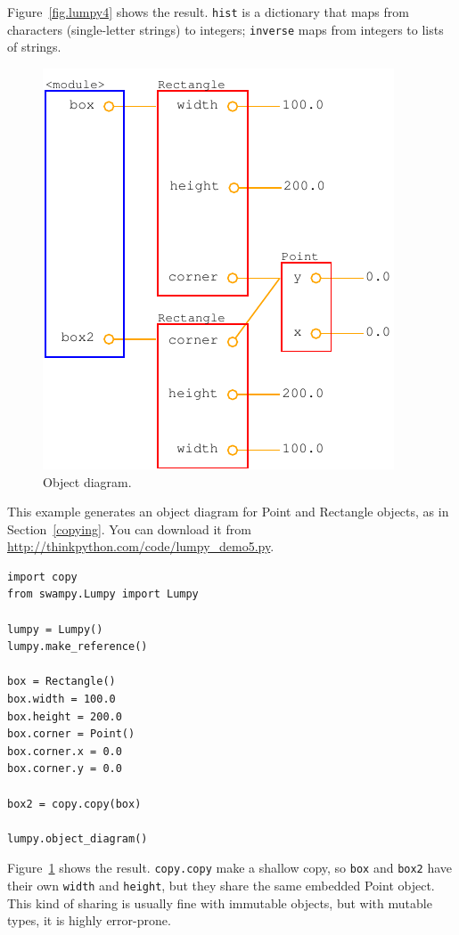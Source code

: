 \documentclass[10pt]{book}
\begin{document}
Figure~\ref{fig.lumpy4} shows the result.  {\tt hist} is a dictionary
that maps from characters (single-letter strings) to integers;
{\tt inverse} maps from integers to lists of strings.

\begin{figure}
\centerline
{\includegraphics[scale=0.7]{figs/lumpydemo5.pdf}}
\caption{Object diagram.}
\label{fig.lumpy5}
\end{figure}

This example generates an object diagram for Point and Rectangle
objects, as in Section~\ref{copying}.  You can download it from
\url{http://thinkpython.com/code/lumpy_demo5.py}.

\begin{verbatim}
import copy
from swampy.Lumpy import Lumpy

lumpy = Lumpy()
lumpy.make_reference()

box = Rectangle()
box.width = 100.0
box.height = 200.0
box.corner = Point()
box.corner.x = 0.0
box.corner.y = 0.0

box2 = copy.copy(box)

lumpy.object_diagram()
\end{verbatim}

Figure~\ref{fig.lumpy5} shows the result.  {\tt copy.copy} make a
shallow copy, so {\tt box} and {\tt box2} have their own {\tt width}
and {\tt height}, but they share the same embedded Point object.  This
kind of sharing is usually fine with immutable objects, but with
mutable types, it is highly error-prone.
\end{document}
